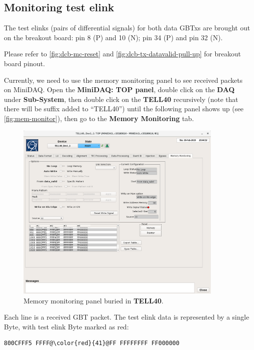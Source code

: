 \subsection{Monitoring test elink}
The test elinks (pairs of differential signals) for both data GBTxs are brought
out on the breakout board: pin 8 (P) and 10 (N); pin 34 (P) and pin 32 (N).

Please refer to
\autoref{fig:dcb-mc-reset} and \autoref{fig:dcb-tx-datavalid-pull-up} for
breakout board pinout.

Currently, we need to use the memory monitoring panel to see received packets on
MiniDAQ. Open the \textbf{MiniDAQ: TOP panel}, double click on the
\textbf{DAQ} under \textbf{Sub-System}, then double click on the \textbf{TELL40}
recursively (note that there will be suffix added to ``TELL40'') until the
following panel shows up (see \autoref{fig:mem-monitor}), then go to the
\textbf{Memory Monitoring} tab.

\begin{figure}[ht]
    \centering
    \includegraphics[width=0.9\textwidth]{res/memory_monitoring_panel.png}
    \caption{Memory monitoring panel buried in \textbf{TELL40}.}
    \label{fig:mem-monitor}
\end{figure}

Each line is a received GBT packet. The test elink data is represented by a
single Byte, with test elink Byte marked as red:

\begin{lstlisting}[escapechar=@]
800CFFF5 FFFF@\color{red}{41}@FF FFFFFFFF FF000000
\end{lstlisting}
